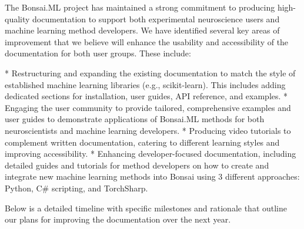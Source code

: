The Bonsai.ML project has maintained a strong commitment to producing high-quality documentation to support both experimental neuroscience users and machine learning method developers. We have identified several key areas of improvement that we believe will enhance the usability and accessibility of the documentation for both user groups. These include:

* Restructuring and expanding the existing documentation to match the style of established machine learning libraries (e.g., scikit-learn). This includes adding dedicated sections for installation, user guides, API reference, and examples.
* Engaging the user community to provide tailored, comprehensive examples and user guides to demonstrate applications of Bonsai.ML methods for both neuroscientists and machine learning developers.
* Producing video tutorials to complement written documentation, catering to different learning styles and improving accessibility.
* Enhancing developer-focused documentation, including detailed guides and tutorials for method developers on how to create and integrate new machine learning methods into Bonsai using 3 different approaches: Python, C# scripting, and TorchSharp.

Below is a detailed timeline with specific milestones and rationale that outline our plans for improving the documentation over the next year.

